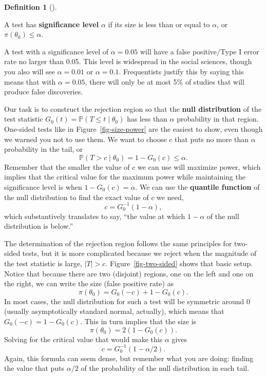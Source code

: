 \documentclass[
  letterpaper,
  DIV=11,
  numbers=noendperiod]{scrreprt}
\renewcommand{\P}{\mathbb{P}}
\theoremstyle{definition}
\theoremstyle{definition}
\newtheorem{definition}{Definition}[chapter]
\theoremstyle{plain}
\theoremstyle{remark}
\begin{document}
\begin{definition}[]\protect\hypertarget{def-level}{}\label{def-level}

A test has \textbf{significance level} \(\alpha\) if its size is less
than or equal to \(\alpha\), or \(\pi(\theta_0) \leq \alpha\).

\end{definition}

A test with a significance level of \(\alpha = 0.05\) will have a false
positive/Type I error rate no larger than 0.05. This level is widespread
in the social sciences, though you also will see \(\alpha = 0.01\) or
\(\alpha = 0.1\). Frequentists justify this by saying this means that
with \(\alpha = 0.05\), there will only be at most 5\% of studies that
will produce false discoveries.

Our task is to construct the rejection region so that the \textbf{null
distribution} of the test statistic
\(G_0(t) = \P(T \leq t \mid \theta_0)\) has less than \(\alpha\)
probability in that region. One-sided tests like in
Figure~\ref{fig-size-power} are the easiest to show, even though we
warned you not to use them. We want to choose \(c\) that puts no more
than \(\alpha\) probability in the tail, or \[ 
\P(T > c \mid \theta_0) = 1 - G_0(c) \leq \alpha.
\] Remember that the smaller the value of \(c\) we can use will maximize
power, which implies that the critical value for the maximum power while
maintaining the significance level is when \(1 - G_0(c) = \alpha\). We
can use the \textbf{quantile function} of the null distribution to find
the exact value of \(c\) we need, \[
c = G^{-1}_0(1 - \alpha),
\] which substantively translates to say, ``the value at which
\(1-\alpha\) of the null distribution is below.''

The determination of the rejection region follows the same principles
for two-sided tests, but it is more complicated because we reject when
the magnitude of the test statistic is large, \(|T| > c\).
Figure~\ref{fig-two-sided} shows that basic setup. Notice that because
there are two (disjoint) regions, one on the left and one on the right,
we can write the size (false positive rate) as \[ 
\pi(\theta_0) = G_0(-c) + 1 - G_0(c).
\] In most cases, the null distribution for such a test will be
symmetric around 0 (usually asymptotically standard normal, actually),
which means that \(G_0(-c) = 1 - G_0(c)\). This in turn implies that the
size is \[ 
\pi(\theta_0) = 2(1 - G_0(c)).
\] Solving for the critical value that would make this \(\alpha\) gives
\[ 
c = G^{-1}_0(1 - \alpha/2).
\] Again, this formula can seem dense, but remember what you are doing:
finding the value that puts \(\alpha/2\) of the probability of the null
distribution in each tail.
\end{document}
